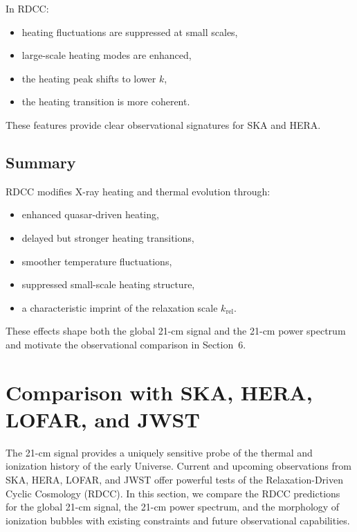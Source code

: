 \documentclass[11pt,a4paper]{article}
\begin{document}
In RDCC:
\begin{itemize}
\item heating fluctuations are suppressed at small scales,
\item large-scale heating modes are enhanced,
\item the heating peak shifts to lower $k$,
\item the heating transition is more coherent.
\end{itemize}

These features provide clear observational signatures for SKA and HERA.

\subsection{Summary}

RDCC modifies X-ray heating and thermal evolution through:
\begin{itemize}
\item enhanced quasar-driven heating,
\item delayed but stronger heating transitions,
\item smoother temperature fluctuations,
\item suppressed small-scale heating structure,
\item a characteristic imprint of the relaxation scale $k_{\mathrm{rel}}$.
\end{itemize}

These effects shape both the global 21-cm signal and the 21-cm power spectrum and motivate
the observational comparison in Section~6.

\section{Comparison with SKA, HERA, LOFAR, and JWST}

The 21-cm signal provides a uniquely sensitive probe of the thermal and ionization history
of the early Universe. Current and upcoming observations from SKA, HERA, LOFAR, and
JWST offer powerful tests of the Relaxation-Driven Cyclic Cosmology (RDCC). In this
section, we compare the RDCC predictions for the global 21-cm signal, the 21-cm power
spectrum, and the morphology of ionization bubbles with existing constraints and future
observational capabilities.
\end{document}
